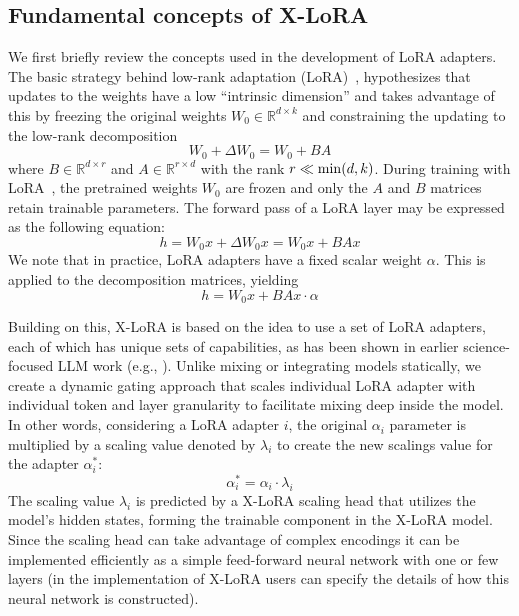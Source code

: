 \documentclass{article}
\begin{document}
\subsection{Fundamental concepts of X-LoRA}

We first briefly review the concepts used in the development of LoRA adapters. The basic strategy behind low-rank adaptation (LoRA)~\cite{hu2021lora}, hypothesizes that updates to the weights have a low “intrinsic dimension” and takes advantage of this by freezing the original weights $W_0 \in \mathbb{R}^{d \times k}$ and constraining the updating to the low-rank decomposition 
\begin{equation}
W_0 + \Delta W_0 = W_0 + BA 
\end{equation}
where $B \in \mathbb{R}^{d \times r}$  and $A \in \mathbb{R}^{r \times d}$ with the rank $r \ll {\rm min}(d,k)$. During training with LoRA~\cite{hu2021lora}, the pretrained weights $W_0$ are frozen and only the $A$ and $B$ matrices retain trainable parameters. The forward pass of a LoRA layer may be expressed as the following equation:
\begin{equation}
    h = W_0x + \Delta W_0x = W_0x + BAx
\end{equation}
We note that in practice, LoRA adapters have a fixed scalar weight $\alpha$. This is applied to the decomposition matrices, yielding
\begin{equation}
    h = W_0x + BAx \cdot \alpha
\end{equation}

Building on this, X-LoRA is based on the idea to use a set of LoRA adapters, each of which has unique sets of capabilities, as has been shown in earlier science-focused LLM work (e.g., \cite{Buehler2023GenerativeDesign}). Unlike mixing or integrating models statically, we create a dynamic gating approach that scales individual LoRA adapter with individual token and layer granularity to facilitate mixing deep inside the model. In other words, considering a LoRA adapter $i$, the original $\alpha_i$ parameter is multiplied by a scaling value denoted by $\lambda_i$ to create the new scalings value for the adapter $\alpha^*_i$:
%
\begin{equation}
    \alpha^*_i = \alpha_i \cdot \lambda_i
\end{equation}
%
The scaling value $\lambda_i$ is predicted by a X-LoRA scaling head that utilizes the model's hidden states, forming the trainable component in the X-LoRA model. Since the scaling head can take advantage of complex encodings it can be implemented efficiently as a simple feed-forward neural network with one or few layers (in the implementation of X-LoRA users can specify the details of how this neural network is constructed).
\end{document}
